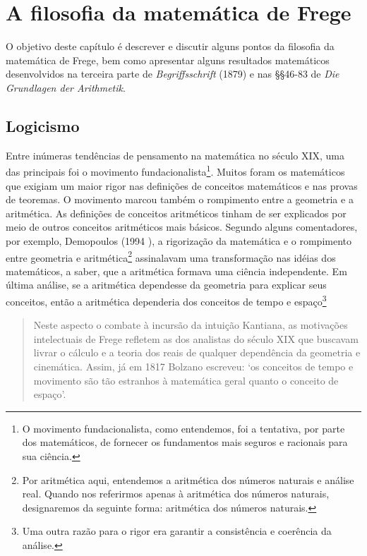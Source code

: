 \artigofalse
\chapter{A filosofia da matemática de Frege}

O objetivo deste capítulo é descrever e discutir alguns pontos da filosofia da matemática de Frege, bem como apresentar alguns resultados matemáticos desenvolvidos na terceira parte de \textit{Begriffsschrift} (1879\nocite{Frege1998}) e nas §§46-83 de \textit{Die Grundlagen der Arithmetik}.

\section{Logicismo}

Entre inúmeras tendências de pensamento na matemática no século XIX, uma das principais foi o movimento fundacionalista\footnote{O movimento fundacionalista, como entendemos, foi a tentativa, por parte dos matemáticos, de fornecer os fundamentos mais seguros e racionais para sua ciência.}. Muitos foram os matemáticos que exigiam um maior rigor nas definições de conceitos matemáticos e nas provas de teoremas. O movimento marcou também o rompimento entre a geometria e a aritmética. As definições de conceitos aritméticos tinham de ser explicados por meio de outros conceitos aritméticos mais básicos. Segundo alguns comentadores, por exemplo, Demopoulos (1994 \nocite{Demopoulos1995a}\nocite{Demopoulos1995}), a rigorização da matemática e o rompimento entre geometria e aritmética\footnote{Por aritmética aqui, entendemos a aritmética dos números naturais e análise real. Quando nos referirmos apenas à aritmética dos números naturais, designaremos da seguinte forma: aritmética dos números naturais.} assinalavam uma transformação nas idéias dos matemáticos, a saber, que a aritmética formava uma ciência independente. Em última análise, se a aritmética dependesse da geometria para explicar seus conceitos, então a aritmética dependeria dos conceitos de tempo e espaço\footnote{Uma outra razão para o rigor era garantir a consistência e coerência da análise.} 

\begin{quote}
Neste aspecto o combate à incursão da intuição Kantiana, as motivações intelectuais de Frege refletem as dos analistas do século XIX que buscavam livrar o cálculo e a teoria dos reais de qualquer dependência da geometria e cinemática. Assim, já em 1817 Bolzano escreveu: ‘os conceitos de tempo e movimento são tão estranhos à matemática geral quanto o conceito de espaço’.\cite[p. 76]{Demopoulos1995a}
\end{quote}
